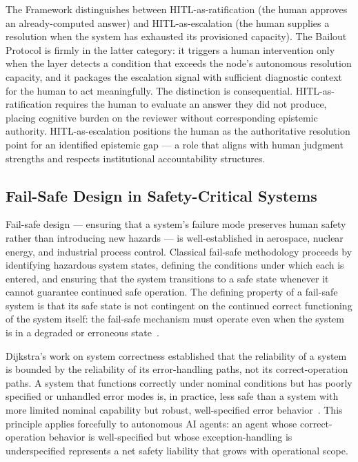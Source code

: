 The \bxthree{} Framework distinguishes between HITL-as-ratification (the human approves an already-computed answer) and HITL-as-escalation (the human supplies a resolution when the system has exhausted its provisioned capacity). The Bailout Protocol is firmly in the latter category: it triggers a human intervention only when the \bounds{} layer detects a condition that exceeds the node's autonomous resolution capacity, and it packages the escalation signal with sufficient diagnostic context for the human to act meaningfully. The distinction is consequential. HITL-as-ratification requires the human to evaluate an answer they did not produce, placing cognitive burden on the reviewer without corresponding epistemic authority. HITL-as-escalation positions the human as the authoritative resolution point for an identified epistemic gap — a role that aligns with human judgment strengths and respects institutional accountability structures.

\subsection{Fail-Safe Design in Safety-Critical Systems}
\label{sec:failsafe}

Fail-safe design — ensuring that a system's failure mode preserves human safety rather than introducing new hazards — is well-established in aerospace, nuclear energy, and industrial process control. Classical fail-safe methodology proceeds by identifying hazardous system states, defining the conditions under which each is entered, and ensuring that the system transitions to a safe state whenever it cannot guarantee continued safe operation. The defining property of a fail-safe system is that its safe state is not contingent on the continued correct functioning of the system itself: the fail-safe mechanism must operate even when the system is in a degraded or erroneous state~\cite{dijkstra1982,wiener1948}.

Dijkstra's work on system correctness established that the reliability of a system is bounded by the reliability of its error-handling paths, not its correct-operation paths. A system that functions correctly under nominal conditions but has poorly specified or unhandled error modes is, in practice, less safe than a system with more limited nominal capability but robust, well-specified error behavior~\cite{dijkstra1982}. This principle applies forcefully to autonomous AI agents: an agent whose correct-operation behavior is well-specified but whose exception-handling is underspecified represents a net safety liability that grows with operational scope.

